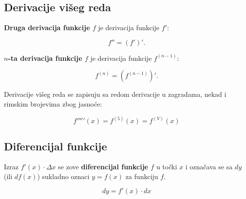 \subsection{Derivacije višeg reda}

\begin{definition}
    \textbf{Druga derivacija funkcije $f$} je derivacija funkcije $f'$:

    \begin{equation*}
        f'' = (f')'.
    \end{equation*}

    \textbf{$n$-ta derivacija funkcije $f$} je derivacija funkcije $f^{(n-1)}$:

    \begin{equation*}
        f^{(n)} = \left(f^{(n-1)}\right)'.
    \end{equation*}
\end{definition}

Derivacije višeg reda se zapisuju sa redom derivacije u zagradama, nekad i rimskim
brojevima zbog jasnoće:

$$
f'''''(x) = f^{(5)}(x) = f^{(V)}(x)
$$

\subsection{Diferencijal funkcije}

\begin{definition}
    Izraz $f'(x)\cdot\Delta x$ se zove \textbf{diferencijal funkcije $f$} u točki
    $x$ i označava se sa $dy$ (ili $df(x)$) sukladno oznaci $y=f(x)$ za funkciju $f$.

    \begin{equation*}
        dy = f'(x)\cdot dx
    \end{equation*}
\end{definition}

